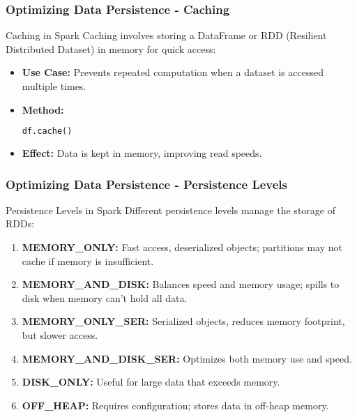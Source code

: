 \documentclass[aspectratio=169]{beamer}
\begin{document}
\begin{frame}[fragile]
    \frametitle{Optimizing Data Persistence - Caching}
    \begin{block}{Caching in Spark}
        Caching involves storing a DataFrame or RDD (Resilient Distributed Dataset) in memory for quick access:
        \begin{itemize}
            \item \textbf{Use Case:} Prevents repeated computation when a dataset is accessed multiple times.
            \item \textbf{Method:}
            \begin{lstlisting}[language=Python]
df.cache()
            \end{lstlisting}
            \item \textbf{Effect:} Data is kept in memory, improving read speeds.
        \end{itemize}
    \end{block}
\end{frame}

\begin{frame}[fragile]
    \frametitle{Optimizing Data Persistence - Persistence Levels}
    \begin{block}{Persistence Levels in Spark}
        Different persistence levels manage the storage of RDDs:
        \begin{enumerate}
            \item \textbf{MEMORY\_ONLY:} Fast access, deserialized objects; partitions may not cache if memory is insufficient.
            \item \textbf{MEMORY\_AND\_DISK:} Balances speed and memory usage; spills to disk when memory can't hold all data.
            \item \textbf{MEMORY\_ONLY\_SER:} Serialized objects, reduces memory footprint, but slower access.
            \item \textbf{MEMORY\_AND\_DISK\_SER:} Optimizes both memory use and speed.
            \item \textbf{DISK\_ONLY:} Useful for large data that exceeds memory.
            \item \textbf{OFF\_HEAP:} Requires configuration; stores data in off-heap memory.
        \end{enumerate}
    \end{block}
\end{frame}
\end{document}
